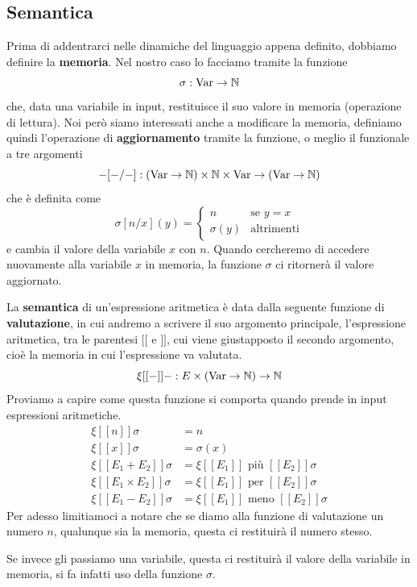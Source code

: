 \subsection{Semantica}
Prima di addentrarci nelle dinamiche del linguaggio appena
definito, dobbiamo definire la \textbf{memoria}. Nel nostro
caso lo facciamo tramite la funzione
\[ \sigma : \operatorname{Var} \to \mathbb{N} \]
che, data una variabile in input, restituisce il suo valore
in memoria (operazione di lettura). Noi però siamo interessati
anche a modificare la memoria, definiamo quindi l'operazione
di \textbf{aggiornamento} tramite la funzione, o meglio il
funzionale a tre argomenti
\[
	- [ - / - ] : (\operatorname{Var} \to \mathbb{N}) \times
	\mathbb{N} \times \operatorname{Var} \to (\operatorname{Var} \to \mathbb{N})
\]
che è definita come
\[
	\sigma [n / x](y) = \begin{cases}
		n         & \text{se } y = x  \\
		\sigma(y) & \text{altrimenti}
	\end{cases}
\]
e cambia il valore della variabile $x$ con $n$. Quando
cercheremo di accedere nuovamente alla variabile $x$ in
memoria, la funzione $\sigma$ ci ritornerà il valore aggiornato.

La \textbf{semantica} di un'espressione aritmetica è data
dalla seguente funzione di \textbf{valutazione}, in cui andremo
a scrivere il suo argomento principale, l'espressione aritmetica,
tra le parentesi $[[$ e $]]$, cui viene giustapposto il secondo
argomento, cioè la memoria in cui l'espressione va valutata.
\[ \xi [[-]] - : E \times (\operatorname{Var} \to \mathbb{N}) \to \mathbb{N} \]
Proviamo a capire come questa funzione si comporta quando
prende in input espressioni aritmetiche.
\begin{align*}
	\xi [[n]] \sigma              & = n         \\
	\xi [[x]] \sigma              & = \sigma(x) \\
	\xi [[E_1 + E_2]] \sigma      &
	= \xi [[E_1]] \text{ più } [[E_2]] \sigma   \\
	\xi [[E_1 \times E_2]] \sigma &
	= \xi [[ E_1 ]] \text{ per } [[E_2]] \sigma \\
	\xi [[E_1 - E_2]] \sigma      &
	= \xi [[ E_1 ]] \text{ meno } [[E_2]] \sigma
\end{align*}
Per adesso limitiamoci a notare che se diamo alla funzione di
valutazione un numero $n$, qualunque sia la memoria, questa
ci restituirà il numero stesso.

Se invece gli passiamo una variabile, questa ci restituirà
il valore della variabile in memoria, si fa infatti uso della
funzione $\sigma$.


